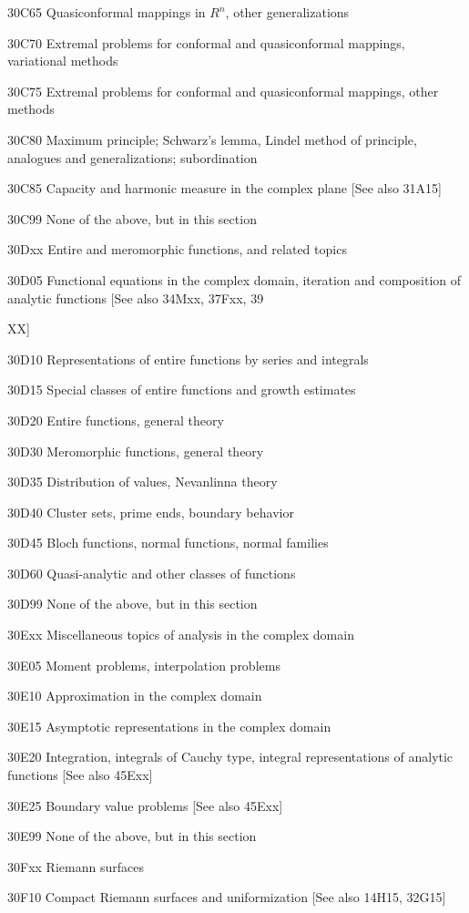 \documentclass[12pt]{article}
\theoremstyle{plain}
\theoremstyle{definition}
\numberwithin{equation}{section}
\begin{document}
{{{30C65 Quasiconformal mappings in $R^n$, other generalizations

30C70 Extremal problems for conformal and quasiconformal mappings, variational methods

30C75 Extremal problems for conformal and quasiconformal mappings, other methods

30C80 Maximum principle; Schwarz's lemma, Lindel method of principle, analogues and generalizations; subordination

30C85 Capacity and harmonic measure in the complex plane [See also 31A15]

30C99 None of the above, but in this section

30Dxx Entire and meromorphic functions, and related topics

30D05 Functional equations in the complex domain, iteration and composition of analytic functions [See also 34Mxx, 37Fxx, 39{XX]

30D10 Representations of entire functions by series and integrals

30D15 Special classes of entire functions and growth estimates

30D20 Entire functions, general theory

30D30 Meromorphic functions, general theory

30D35 Distribution of values, Nevanlinna theory

30D40 Cluster sets, prime ends, boundary behavior

30D45 Bloch functions, normal functions, normal families

30D60 Quasi-analytic and other classes of functions

30D99 None of the above, but in this section

30Exx Miscellaneous topics of analysis in the complex domain

30E05 Moment problems, interpolation problems

30E10 Approximation in the complex domain

30E15 Asymptotic representations in the complex domain

30E20 Integration, integrals of Cauchy type, integral representations of analytic functions [See also 45Exx]

30E25 Boundary value problems [See also 45Exx]

30E99 None of the above, but in this section

30Fxx Riemann surfaces

30F10 Compact Riemann surfaces and uniformization [See also 14H15, 32G15]

}}}}
\end{document}
